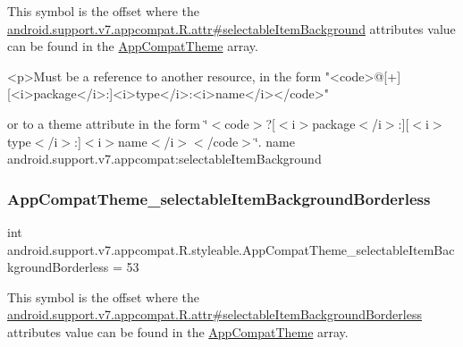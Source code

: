 This symbol is the offset where the \hyperlink{classandroid_1_1support_1_1v7_1_1appcompat_1_1R_1_1attr_a87c474abcdf634b03663abfe1d1ad911}{android.\+support.\+v7.\+appcompat.\+R.\+attr\#selectable\+Item\+Background} attribute\textquotesingle{}s value can be found in the \hyperlink{classandroid_1_1support_1_1v7_1_1appcompat_1_1R_1_1styleable_a5c42f89e8a410c323be34208d75c430b}{App\+Compat\+Theme} array.

\begin{DoxyVerb}      <p>Must be a reference to another resource, in the form "<code>@[+][<i>package</i>:]<i>type</i>:<i>name</i></code>"
\end{DoxyVerb}
 or to a theme attribute in the form \char`\"{}$<$code$>$?\mbox{[}$<$i$>$package$<$/i$>$\+:\mbox{]}\mbox{[}$<$i$>$type$<$/i$>$\+:\mbox{]}$<$i$>$name$<$/i$>$$<$/code$>$\char`\"{}.  name android.\+support.\+v7.\+appcompat\+:selectable\+Item\+Background \mbox{\label{classandroid_1_1support_1_1v7_1_1appcompat_1_1R_1_1styleable_a6b4e748fcf3ab58f9a756773bb3bf432}} 
\subsubsection{\texorpdfstring{App\+Compat\+Theme\+\_\+selectable\+Item\+Background\+Borderless}{AppCompatTheme\_selectableItemBackgroundBorderless}}
{\footnotesize\ttfamily int android.\+support.\+v7.\+appcompat.\+R.\+styleable.\+App\+Compat\+Theme\+\_\+selectable\+Item\+Background\+Borderless = 53\hspace{0.3cm}{\ttfamily [static]}}

This symbol is the offset where the \hyperlink{classandroid_1_1support_1_1v7_1_1appcompat_1_1R_1_1attr_aab4c287d6aa1e792e2151d495253b9aa}{android.\+support.\+v7.\+appcompat.\+R.\+attr\#selectable\+Item\+Background\+Borderless} attribute\textquotesingle{}s value can be found in the \hyperlink{classandroid_1_1support_1_1v7_1_1appcompat_1_1R_1_1styleable_a5c42f89e8a410c323be34208d75c430b}{App\+Compat\+Theme} array.

